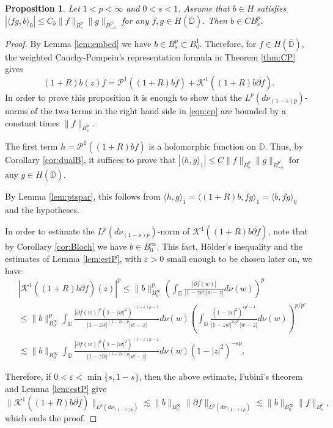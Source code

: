 \documentclass[12pt,twoside,leqno,final]{amsart}
\theoremstyle{plain}
\newtheorem{prop}[thm]{Proposition}
\begin{document}
\begin{prop} 
Let $1<p<\infty$ and  $0<s<1$. Assume that $b\in H$ satisfies 
$
|\langle fg,b\rangle_0|\le C_b \|f\|_{B^p_s}\|g\|_{B^{p'}_{-s}}$ for any $f,g\in H(\overline{{\mathbb D}})$.  
Then $b\in CB^p_s$.
\end{prop}

\begin{proof}
By Lemma \ref{lem:embed} we have $b\in B^{p}_{s}\subset B^1_0$. 
Therefore, for $f\in H(\overline{{\mathbb D}})$, the  weighted Cauchy-Pompeiu's representation formula in Theorem \ref{thm:CP}  gives 
\begin{equation}\label{eqn:cp}
(1+R)b(z)\overline {f}={{\mathcal P}}^{1}((1+R)b\overline {f})+{{\mathcal K}}^{1}((1+R)b\overline {{\partial} f}).
\end{equation}
In order to prove this proposition it is enough to show that the $L^p(d\nu_{(1-s)p})$-norms of
the two terms in the right hand side in \eqref{eqn:cp} are bounded by  a constant times $\|f\|_{B^p_s}$.

The first term  $h={{\mathcal P}}^{1}((1+R) b \overline{f})$ is a holomorphic function  on ${{\mathbb D}}$. 
Thus, by Corollary \ref{cor:dualB}, it suffices to prove that  
$
|\langle h, g\rangle_{1}|\le C \|f\|_{B^p_s}\|g\|_{B^{p'}_{-s}}
$
for any $g\in H(\overline{{\mathbb D}})$.

By Lemma \ref{lem:ptspar}, this follows from $\langle h, g\rangle_{1}=\langle (1+R)b, fg\rangle_1=\langle b, fg\rangle_0$ 
and the hypotheses.

In  order to  estimate  the $L^p( d\nu_{(1-s)p})$-norm of 
${{\mathcal K}}^{1}((1+R)b\overline {{\partial} f})$, note that by Corollary \ref{cor:Bloch} we have $b\in B^\infty_0$. This fact, 
H\"older's inequality and the estimates of Lemma \ref{lem:estP}, 
with ${\varepsilon}>0$ small enough to be chosen later on, we have
\begin{align*}
&|{{\mathcal K}}^{1}((1+R)b\overline {{\partial} f})(z)|^p
\le \|b\|_{B^\infty_0}^p \left(\int_{{\mathbb D}}\frac{|{\partial} f(w)|}{|1-z\overline w||w-z|}d\nu(w)\right)^p\\
&\le \|b\|_{B^\infty_0}^p \int_{{\mathbb D}}\frac{|{\partial} f(w)|^p(1-|w|^2)^{(1-{\varepsilon})p-1}}
{|1-z\overline w|^{(1-2{\varepsilon})p}|w-z|}d\nu(w)
\left(\int_{{\mathbb D}}\frac{(1-|w|^2)^{{\varepsilon} p'-1}}
{|1-z\overline w|^{2{\varepsilon} p'}|w-z|}d\nu(w) \right)^{p/p'}\\
&\lesssim \|b\|_{B^\infty_0}\int_{{\mathbb D}}\frac{|{\partial} f(w)|^p(1-|w|^2)^{(1-{\varepsilon})p-1}}
{|1-z\overline w|^{(1-2{\varepsilon})p}|w-z|}d\nu(w) (1-|z|^2)^{-{\varepsilon} p}.
\end{align*}

Therefore, if $0<{\varepsilon}<\min\{s,1-s\}$, then the above estimate, Fubini's theorem and Lemma \ref{lem:estP} give
$$
\|{{\mathcal K}}^{1}((1+R)b\overline {{\partial} f})\|_{L^p(d\nu_{(1-s)p})}\lesssim \|b\|_{B^\infty_0} 
\|{\partial} f\|_{L^p( d\nu_{(1-s)p})}\lesssim \|b\|_{B^\infty_0}\|f\|_{B^p_s},
$$
which ends the proof.
\end{proof} 
\end{document}
